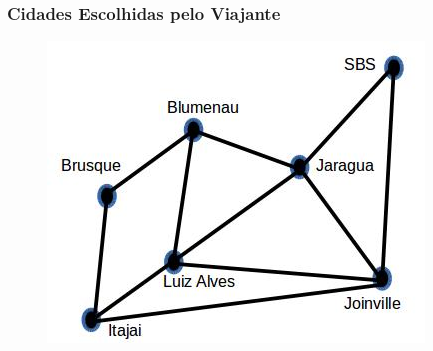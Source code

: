 \begin{frame}[fragile]
\frametitle{Cidades Escolhidas pelo Viajante}

\begin{figure}[!htb]
\centering
\includegraphics[width=.8\textwidth, height=0.567\textheight]{figures/mapa01SC.jpg}
\end{figure}

\end{frame}




